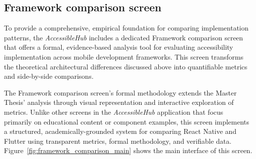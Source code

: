 \subsection{Framework comparison screen}

To provide a comprehensive, empirical foundation for comparing implementation patterns, the \textit{AccessibleHub} includes a dedicated Framework comparison screen that offers a formal, evidence-based analysis tool for evaluating accessibility implementation across mobile development frameworks. This screen transforms the theoretical architectural differences discussed above into quantifiable metrics and side-by-side comparisons.

The Framework comparison screen's formal methodology extends the Master Thesis' analysis through visual representation and interactive exploration of metrics. Unlike other screens in the \textit{AccessibleHub} application that focus primarily on educational content or component examples, this screen implements a structured, academically-grounded system for comparing React Native and Flutter using transparent metrics, formal methodology, and verifiable data. Figure~\ref{fig:framework_comparison_main} shows the main interface of this screen.

